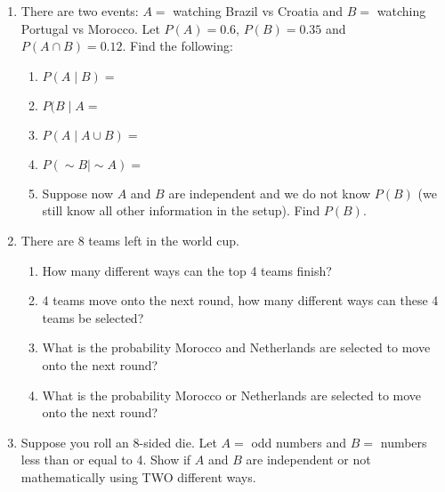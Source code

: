 \documentclass{article}
\newcommand{\comp}{{\sim}}			%
\begin{document}
\begin{enumerate}
   \item There are two events: $A = $ watching Brazil vs Croatia and $B = $ watching Portugal vs Morocco. Let $P(A) = 0.6$, $P(B) = 0.35$ and $P(A \cap B) = 0.12$. Find the following:\bigskip
   \begin{enumerate}
       \item $P(A \mid B) = $\vspace{40pt}
       \item $P(B \mid A = $\vspace{40pt}
       \item $P(A \mid A \cup B) = $\vspace{40pt}
       \item $P(\comp B \mid \comp A) = $\vspace{40pt}
       \item Suppose now $A$ and $B$ are independent and we do not know $P(B)$ (we still know all other information in the setup). Find $P(B)$.\vspace{40pt}
   \end{enumerate}\bigskip
   
    \item There are 8 teams left in the world cup.\bigskip
    \begin{enumerate}
        \item How many different ways can the top 4 teams finish?\vspace{30pt}
        \item 4 teams move onto the next round, how many different ways can these 4 teams be selected?\vspace{30pt}
        \item What is the probability Morocco and Netherlands are selected to move onto the next round?\vspace{50pt}
        \item What is the probability Morocco or Netherlands are selected to move onto the next round?\vspace{50pt}
    \end{enumerate}\bigskip
    
    \item Suppose you roll an 8-sided die. Let $A =$ odd numbers and $B =$ numbers less than or equal to 4. Show if $A$ and $B$ are independent or not mathematically using TWO different ways.\vspace{100pt}
    

\end{enumerate}
\end{document}
